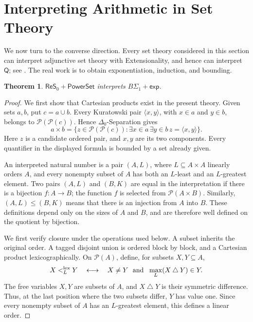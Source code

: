 \documentclass[11pt,a4paper]{article}
\newcommand{\Q}{\mathsf Q}
\newcommand{\BS}[1]{B\Sigma_{#1}}
\newcommand{\expax}{\mathsf{exp}}
\newcommand{\ReSzero}{\mathsf{ReS}_{0}}
\newcommand{\Pow}{\mathsf{PowerSet}}
\theoremstyle{plain}
\newtheorem{theorem}{Theorem}[section]
\theoremstyle{definition}
\theoremstyle{remark}
\begin{document}
\section{Interpreting Arithmetic in Set Theory}

We now turn to the converse direction. Every set theory considered in this section can interpret adjunctive set theory with Extensionality, and hence can interpret \(\Q\); see \citep{CollinsHalpern1970,Damnjanovic2017,Visser2008}. The real work is to obtain exponentiation, induction, and bounding.

\begin{theorem}
  \(\ReSzero+\Pow\) interprets \(\BS1+\expax\).
\end{theorem}
\begin{proof}
  We first show that Cartesian products exist in the present theory. Given sets \(a,b\), put \(c=a\cup b\). Every Kuratowski pair \(\langle x,y\rangle\), with \(x\in a\) and \(y\in b\), belongs to \(\mathcal P(\mathcal P(c))\). Hence \(\Delta_0\)-Separation gives
  \[
  a\times b=\{z\in\mathcal P(\mathcal P(c)):
  \exists x\in a\,\exists y\in b\,z=\langle x,y\rangle\}.
  \]
  Here \(z\) is a candidate ordered pair, and \(x,y\) are its two components. Every quantifier in the displayed formula is bounded by a set already given.

  An interpreted natural number is a pair \((A,L)\), where \(L\subseteq A\times A\) linearly orders \(A\), and every nonempty subset of \(A\) has both an \(L\)-least and an \(L\)-greatest element. Two pairs \((A,L)\) and \((B,K)\) are equal in the interpretation if there is a bijection \(f:A\to B\); the function \(f\) is selected from \(\mathcal P(A\times B)\). Similarly, \((A,L)\leq(B,K)\) means that there is an injection from \(A\) into \(B\). These definitions depend only on the sizes of \(A\) and \(B\), and are therefore well defined on the quotient by bijection.

  We first verify closure under the operations used below. A subset inherits the original order. A tagged disjoint union is ordered block by block, and a Cartesian product lexicographically. On \(\mathcal P(A)\), define, for subsets \(X,Y\subseteq A\),
  \[
  X<_{L}^{\rm lex}Y
  \quad\longleftrightarrow\quad
  X\neq Y\ \text{ and }\ \max_L(X\mathbin\triangle Y)\in Y.
  \]
  The free variables \(X,Y\) are subsets of \(A\), and \(X\mathbin\triangle Y\) is their symmetric difference. Thus, at the last position where the two subsets differ, \(Y\) has value one. Since every nonempty subset of \(A\) has an \(L\)-greatest element, this defines a linear order.


\end{proof}
\end{document}
